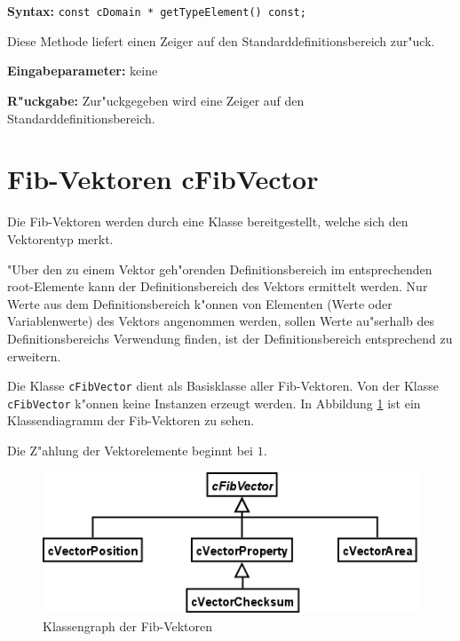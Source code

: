 \ \\\\\noindent
\textbf{Syntax:} \verb|const cDomain * getTypeElement() const;|

\bigskip\noindent
Diese Methode liefert einen Zeiger auf den Standarddefinitionsbereich zur"uck.

\bigskip\noindent
\textbf{Eingabeparameter:} keine

\bigskip\noindent
\textbf{R"uckgabe:} Zur"uckgegeben wird eine Zeiger auf den Standarddefinitionsbereich.





\section{Fib-Vektoren cFibVector}

Die Fib-Vektoren werden durch eine Klasse bereitgestellt, welche sich den Vektorentyp merkt.

"Uber den zu einem Vektor geh"orenden Definitionsbereich im entsprechenden root-Elemente kann der Definitionsbereich des Vektors ermittelt werden.
Nur Werte aus dem Definitionsbereich k"onnen von Elementen (Werte oder Variablenwerte) des Vektors angenommen werden, sollen Werte au"serhalb des Definitionsbereichs Verwendung finden, ist der Definitionsbereich entsprechend zu erweitern.

Die Klasse \verb|cFibVector| dient als Basisklasse aller Fib-Vektoren. Von der Klasse \verb|cFibVector| k"onnen keine Instanzen erzeugt werden. In Abbildung \ref{figClassVectors} ist ein Klassendiagramm der Fib-Vektoren zu sehen.

Die Z"ahlung der Vektorelemente beginnt bei $1$.

\begin{figure}[htbp]
\begin{center}
  \includegraphics[scale=0.4]{fib_vectors}
\end{center}
\caption{Klassengraph der Fib-Vektoren}
\label{figClassVectors}
\end{figure}


